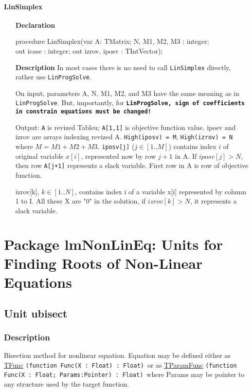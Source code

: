 \documentclass[12pt,a4paper,oneside]{report}
\newcommand{\declarationitem}[1]{\textbf{#1}}
\newcommand{\descriptiontitle}[1]{\textbf{#1}}
\newcommand{\code}[1]{\texttt{#1}}
\begin{document}
\subsubsection{LinSimplex}
\label{ulinsimplex:linsimplex}
\begin{itemize}
	\item[\declarationitem{Declaration}\hfill]
	\begin{flushleft}
	procedure LinSimplex(var  A: TMatrix; N, M1, M2, M3 : integer; \\ \hspace{12pt}out icase : integer; out izrov, iposv : TIntVector);
	\end{flushleft}
	\item[\descriptiontitle{Description}\hfill]
	In most cases there is no need to call \code{LinSimplex} directly, rather use \code{LinProgSolve}. 
	
	On input, parameters A, N, M1, M2, and M3 have the same meaning as in \code{LinProgSolve}. But, importantly, for \textbf\code{LinProgSolve, {sign of coefficients in constrain equations must be changed!}} 
	
	Output: \code{A} is revized Tableu;  \code{A[1,1]} is objective function value. iposv and izrov are arrays indexing revized A. \code{High(iposv) = M}, \code{High(izrov) = N} where $ M = M1 + M2 + M3$.
	\code{iposv[j]} ($j \in [1..M]$) contains index $i$ of original variable $x[i]$, represented now by row $j+1$ in A. If $iposv[j] > N$, then row \code{A[j+1]} represents a slack variable.
	First row in A is row of objective function.
	
	izrov[k], $k \in [1..N]$, contains index i of a variable x[i] represented by column 1 to I.
	All these X are "0" in the solution, if $izrov[k] > N$, it represents a slack variable.
\end{itemize}


\chapter[Package lmNonLinEq]{Package lmNonLinEq: Units for Finding Roots of Non-Linear Equations}\label{package-lmNonLinEq}
\section{Unit ubisect}
\label{ubisect}
\subsection{Description}
Bisection method for nonlinear equation. Equation may be defined either as \hyperref[utypes-TFunc]{TFunc} \code{(function Func(X : Float) : Float)}\ or as \hyperref[utypes-TParamFunc]{TParamFunc} \code{(function Func(X : Float; Params:Pointer) : Float)}\ where Params may be pointer to any structure used by the target function.  
\end{document}
